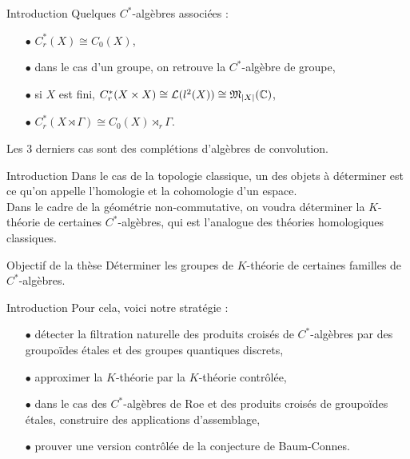 \begin{frame}{Introduction}
Quelques $C^*$-algèbres associées :
\vspace{0.3 cm}
\begin{itemize}
\item[$\bullet$] $C_r^*(X)\cong C_0(X)$,
\vspace{0.3 cm}
\item[$\bullet$] dans le cas d'un groupe, on retrouve la $C^*$-algèbre de groupe,
\vspace{0.3 cm}
\item[$\bullet$] si $X$ est fini, $C^*_r(X\times X) \cong \mathcal L (l^2(X)) \cong \mathfrak M_{|X|}(\mathbb C)$,
\vspace{0.3 cm}
\item[$\bullet$] $C^*_r(X\rtimes \Gamma) \cong C_0(X)\rtimes_r \Gamma$.
\end{itemize}
\vspace{0.3 cm}
Les $3$ derniers cas sont des complétions d'algèbres de convolution. 
\end{frame}

\begin{frame}{Introduction}
Dans le cas de la topologie classique, un des objets à déterminer est ce qu'on appelle l'homologie et la cohomologie d'un espace.\\
\vspace{0.3 cm}
Dans le cadre de la géométrie non-commutative, on voudra déterminer la $K$-théorie de certaines $C^*$-algèbres, qui est l'analogue des théories homologiques classiques. 
\vspace{0.3 cm}
\begin{block}{Objectif de la thèse}
Déterminer les groupes de $K$-théorie de certaines familles de $C^*$-algèbres.
\end{block}
\end{frame}

\begin{frame}{Introduction}
Pour cela, voici notre stratégie :\\
\vspace{0.3 cm}
\begin{itemize}
\item[$\bullet$] détecter la filtration naturelle des produits croisés de $C^*$-algèbres par des groupoïdes étales et des groupes quantiques discrets,
\vspace{0.3 cm}
\item[$\bullet$] approximer la $K$-théorie par la $K$-théorie contrôlée,
\vspace{0.3 cm}
\item[$\bullet$] dans le cas des $C^*$-algèbres de Roe et des produits croisés de groupoïdes étales, construire des applications d'assemblage,
\vspace{0.3 cm}
\item[$\bullet$] prouver une version contrôlée de la conjecture de Baum-Connes.
\end{itemize}
\end{frame}

